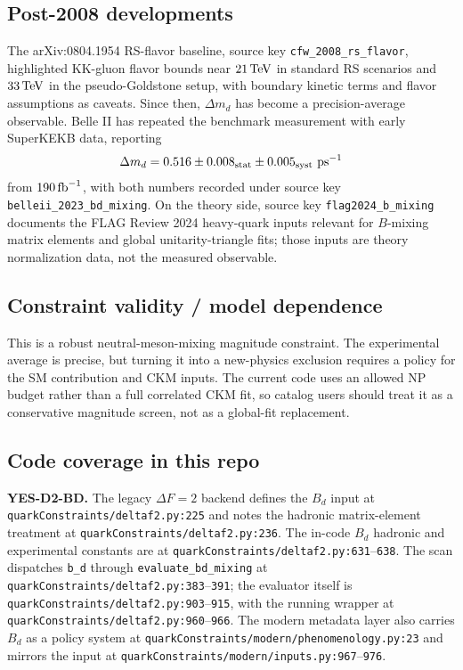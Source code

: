\subsection*{Post-2008 developments}
The arXiv:0804.1954 RS-flavor baseline, source key
\texttt{cfw\_2008\_rs\_flavor}, highlighted KK-gluon flavor bounds near
\(21\,{\rm TeV}\) in standard RS scenarios and \(33\,{\rm TeV}\) in the
pseudo-Goldstone setup, with boundary kinetic terms and flavor assumptions as
caveats.  Since then, \(\Delta m_d\) has become a precision-average observable.
Belle II has repeated the benchmark measurement with early SuperKEKB data,
reporting
\[
  \Delta m_d = 0.516 \pm 0.008_{\rm stat}\pm0.005_{\rm syst}\ {\rm ps}^{-1}
\]
from \(190\,{\rm fb}^{-1}\), with both numbers recorded under source key
\texttt{belleii\_2023\_bd\_mixing}.  On the theory side, source key
\texttt{flag2024\_b\_mixing} documents the FLAG Review 2024 heavy-quark inputs
relevant for \(B\)-mixing matrix elements and global unitarity-triangle fits;
those inputs are theory normalization data, not the measured observable.

\subsection*{Constraint validity / model dependence}
This is a robust neutral-meson-mixing magnitude constraint.  The experimental
average is precise, but turning it into a new-physics exclusion requires a
policy for the SM contribution and CKM inputs.  The current code uses an
allowed NP budget rather than a full correlated CKM fit, so catalog users
should treat it as a conservative magnitude screen, not as a global-fit
replacement.

\subsection*{Code coverage in this repo}
\textbf{YES-D2-BD.}  The legacy \(\Delta F=2\) backend defines the \(B_d\)
input at \texttt{quarkConstraints/deltaf2.py:225} and notes the hadronic
matrix-element treatment at \texttt{quarkConstraints/deltaf2.py:236}.
The in-code \(B_d\) hadronic and experimental constants are at
\texttt{quarkConstraints/deltaf2.py:631}--\texttt{638}.  The scan dispatches
\texttt{b\_d} through \texttt{evaluate\_bd\_mixing} at
\texttt{quarkConstraints/deltaf2.py:383}--\texttt{391}; the evaluator itself is
\texttt{quarkConstraints/deltaf2.py:903}--\texttt{915}, with the running wrapper
at \texttt{quarkConstraints/deltaf2.py:960}--\texttt{966}.  The modern metadata
layer also carries \(B_d\) as a policy system at
\texttt{quarkConstraints/modern/phenomenology.py:23} and mirrors the input at
\texttt{quarkConstraints/modern/inputs.py:967}--\texttt{976}.

